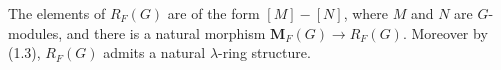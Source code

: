 The elements of $R_F(G)$ are of the form $[M] - [N]$, where $M$ and $N$ are $G$-modules, and there is a natural morphism $\mathbf{M}_F(G) \rightarrow R_F(G)$. Moreover by (1.3), $R_F(G)$ admits a natural $\lambda$-ring structure.
